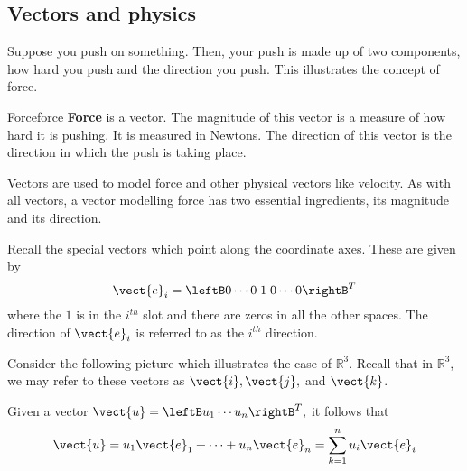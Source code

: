 \subsection{Vectors and physics}

Suppose you push
on something. Then, your push is made up of two components, how hard you push and the direction you push. This illustrates the concept of force.

\begin{definition}{Force}{force}
\textbf{Force} is a vector. The magnitude of this vector is a measure of how
hard it is pushing. It is measured in Newtons. The direction of this vector is the direction in which the push is taking place.
\end{definition}

Vectors are used to model force and other physical vectors like velocity.
 As with all vectors, a vector modelling force has two essential
ingredients, its magnitude and its direction.

Recall the special vectors which point along the coordinate axes.
These are given by 
\begin{equation*}
\vect{e}_{i} = \leftB 0 \cdots 0 \; 1 \; 0 \cdots 0 \rightB^T
\end{equation*}
where the $1$ is in the $i^{th}$ slot and there are zeros in all the other
spaces. The direction of $\vect{e}_{i}$ is referred to as the $i^{th}$ direction.

Consider the following picture which illustrates the case of $\mathbb{R}^{3}.$ 
Recall that in $\mathbb{R}^3$, we may refer to these vectors as $\vect{i}, \vect{j},$ and $\vect{k}$. 

\begin{center}
\end{center}

Given a vector $\vect{u}=\leftB u_{1} \cdots u_{n}\rightB^T ,$ it follows
that
\begin{equation*}
\vect{u}=u_{1}\vect{e}_{1}+\cdots +u_{n}\vect{e}_{n}=
\sum_{k=1}^{n}u_{i}\vect{e}_{i}
\end{equation*}

